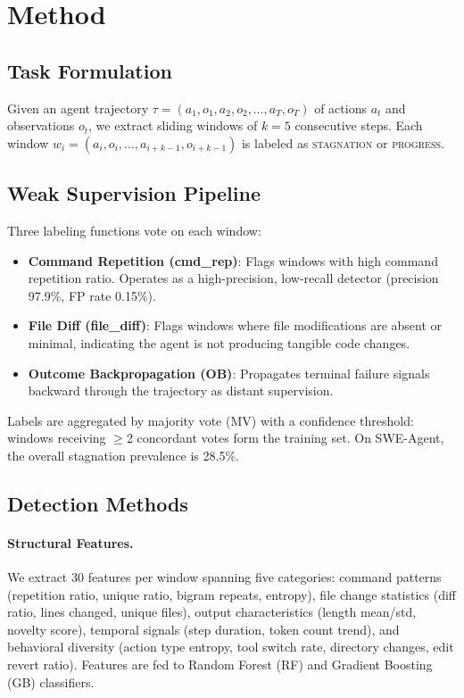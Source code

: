 \documentclass[11pt,a4paper]{article}
\begin{document}
\section{Method}
\label{sec:method}

\subsection{Task Formulation}

Given an agent trajectory $\tau = (a_1, o_1, a_2, o_2, \ldots, a_T, o_T)$ of actions $a_t$ and observations $o_t$, we extract sliding windows of $k=5$ consecutive steps.
Each window $w_i = (a_i, o_i, \ldots, a_{i+k-1}, o_{i+k-1})$ is labeled as \textsc{stagnation} or \textsc{progress}.

\subsection{Weak Supervision Pipeline}

Three labeling functions vote on each window:

\begin{itemize}
\item \textbf{Command Repetition (cmd\_rep)}: Flags windows with high command repetition ratio. Operates as a high-precision, low-recall detector (precision 97.9\%, FP rate 0.15\%).
\item \textbf{File Diff (file\_diff)}: Flags windows where file modifications are absent or minimal, indicating the agent is not producing tangible code changes.
\item \textbf{Outcome Backpropagation (OB)}: Propagates terminal failure signals backward through the trajectory as distant supervision.
\end{itemize}

Labels are aggregated by majority vote (MV) with a confidence threshold: windows receiving $\geq$2 concordant votes form the training set.
On SWE-Agent, the overall stagnation prevalence is 28.5\%.

\subsection{Detection Methods}

\paragraph{Structural Features.}
We extract 30 features per window spanning five categories: command patterns (repetition ratio, unique ratio, bigram repeats, entropy), file change statistics (diff ratio, lines changed, unique files), output characteristics (length mean/std, novelty score), temporal signals (step duration, token count trend), and behavioral diversity (action type entropy, tool switch rate, directory changes, edit revert ratio).
Features are fed to Random Forest (RF) and Gradient Boosting (GB) classifiers.
\end{document}
